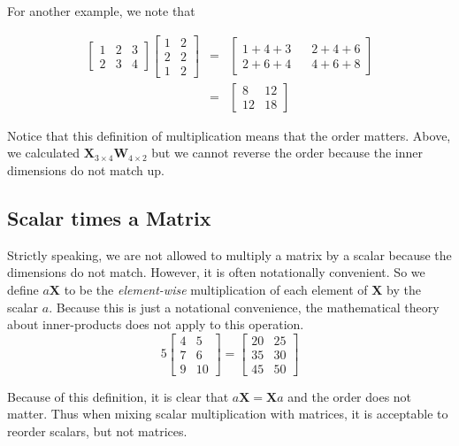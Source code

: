 \documentclass[]{book}
\theoremstyle{definition}
\theoremstyle{definition}
\theoremstyle{remark}
\begin{document}
For another example, we note that

\begin{eqnarray*}
\left[\begin{array}{ccc}
1 & 2 & 3\\
2 & 3 & 4
\end{array}\right]\left[\begin{array}{cc}
1 & 2\\
2 & 2\\
1 & 2
\end{array}\right] & = & \left[\begin{array}{cc}
1+4+3\;\;\; & 2+4+6\\
2+6+4\;\;\; & 4+6+8
\end{array}\right]\\
 & = & \left[\begin{array}{cc}
8 & 12\\
12 & 18
\end{array}\right]
\end{eqnarray*}

Notice that this definition of multiplication means that the order
matters. Above, we calculated
\(\boldsymbol{X}_{3\times4}\boldsymbol{W}_{4\times2}\) but we cannot
reverse the order because the inner dimensions do not match up.

\subsection{Scalar times a Matrix}\label{scalar-times-a-matrix}

Strictly speaking, we are not allowed to multiply a matrix by a scalar
because the dimensions do not match. However, it is often notationally
convenient. So we define \(a\boldsymbol{X}\) to be the
\emph{element-wise} multiplication of each element of \(\boldsymbol{X}\)
by the scalar \(a\). Because this is just a notational convenience, the
mathematical theory about inner-products does not apply to this
operation. \[
5\left[\begin{array}{cc}
4 & 5\\
7 & 6\\
9 & 10
\end{array}\right]=\left[\begin{array}{cc}
20 & 25\\
35 & 30\\
45 & 50
\end{array}\right]
\]

Because of this definition, it is clear that
\(a\boldsymbol{X}=\boldsymbol{X}a\) and the order does not matter. Thus
when mixing scalar multiplication with matrices, it is acceptable to
reorder scalars, but not matrices.
\end{document}
